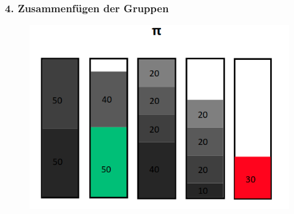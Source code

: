 \documentclass{beamer}
\begin{document}
\begin{frame}
\frametitle{4. Zusammenfügen der Gruppen}
\begin{figure}[!htbp]
\begin{center}
\includegraphics[scale=0.25]{img/HC_4.png}
\end{center}
\end{figure}


\end{frame}
\end{document}
